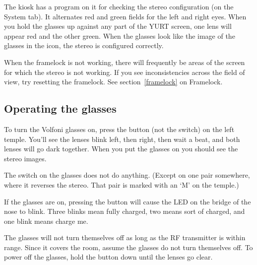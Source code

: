 \documentclass[11pt]{article}
\newcommand{\yurt}{YURT\xspace}
\begin{document}
The kiosk has a program on it for checking the stereo configuration
(on the System tab).  It alternates red and green fields for the left
and right eyes.  When you hold the glasses up against any part of the
\yurt screen, one lens will appear red and the other green.  When the
glasses look like the image of the glasses in the icon, the stereo is
configured correctly.

When the framelock is not working, there will frequently be areas of
the screen for which the stereo is not working.  If you see
inconsistencies across the field of view, try resetting the
framelock.  See section~\ref{framelock} on Framelock.


\iffalse

You can also toggle the stereo by turning projector 11 stereo off and
then on again.

\begin{verbatim}
$ pjcontrol 11 mono
$ pjcontrol 11 stereo
\end{verbatim}

There is only a 50\% chance that this procedure will leave the system
in the correct state, so you may have to try it a few times before it
works properly.  Take comfort in the fact that there is only a 6.25\%
chance you'll have to do it more than four times.

\fi

\subsection{Operating the glasses}

To turn the Volfoni glasses on, press the button (not the switch) on
the left temple.  You'll see the lenses blink left, then right, then
wait a beat, and both lenses will go dark together.  When you put the
glasses on you should see the stereo images.

The switch on the glasses does not do
anything.  (Except on one pair somewhere, where it reverses the
stereo.  That pair is marked with an `M' on the temple.)

If the glasses are on, pressing the button will cause the LED on the
bridge of the nose to blink.  Three blinks mean fully charged, two
means sort of charged, and one blink means charge me.

The glasses will not turn themselves off as long as the RF transmitter
is within range.  Since it covers the room, assume the glasses do not
turn themselves off.  To power off the glasses, hold the button down
until the lenses go clear.
\end{document}
